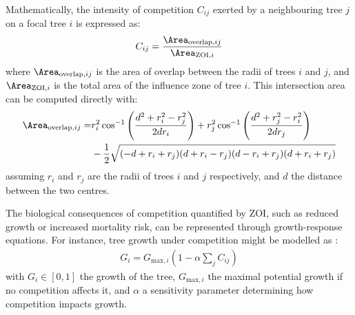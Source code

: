 
Mathematically, the intensity of competition $C_{ij}$ exerted by a neighbouring tree $j$ on a focal tree $i$ is expressed as:
\begin{align}
    C_{ij} = \frac{ \Area_{\text{overlap}, ij} }{ \Area_{\text{ZOI}, i} }
\end{align}
where $\Area_{\text{overlap}, ij}$ is the area of overlap between the radii of trees $i$ and $j$, and $\Area_{\text{ZOI}, i}$ is the total area of the influence zone of tree $i$. This intersection area can be computed directly with:
\begin{align}
    \Area_{\text{overlap}, ij} = &r_i^2 \cos^{-1}\left( \frac{d^2 + r_i^2 - r_j^2}{2 d r_i} \right) + r_j^2 \cos^{-1} \left(\frac{d^2 + r_j^2 - r_i^2}{2 d r_j} \right) \nonumber \\
    & - \frac{1}{2} \sqrt{(-d + r_i + r_j)(d + r_i - r_j)(d - r_i + r_j)(d + r_i + r_j)}
\end{align}
assuming $r_i$ and $r_j$ are the radii of trees $i$ and $j$ respectively, and $d$ the distance between the two centres.

The biological consequences of competition quantified by ZOI, such as reduced growth or increased mortality risk, can be represented through growth-response equations. For instance, tree growth under competition might be modelled as \cite{Das2012,Uriarte2004}:
\begin{align}
    G_i = G_{\text{max}, i} \left(1 - \alpha \sum_{j} {C_{ij}} \right)
\end{align}
with $G_i \in [0, 1]$ the growth of the tree, $G_{\text{max}, i}$ the maximal potential growth if no competition affects it, and $\alpha$ a sensitivity parameter determining how competition impacts growth.

